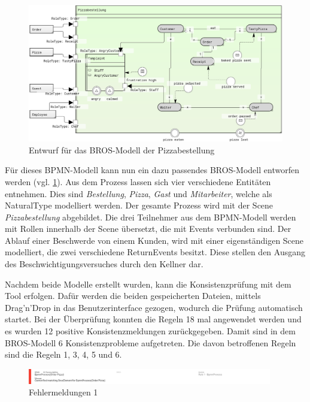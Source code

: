 \begin{figure}
    \centering
    \includegraphics[width=\textwidth,keepaspectratio]{../images/example/bros-rule1.png}%
    \caption{Entwurf für das BROS-Modell der Pizzabestellung}%
    \label{fig:pizzaBros1}
\end{figure}

Für dieses BPMN-Modell kann nun ein dazu passendes BROS-Modell entworfen werden (vgl. \cref{fig:pizzaBros1}).
Aus dem Prozess lassen sich vier verschiedene Entitäten entnehmen.
Dies sind \emph{Bestellung}, \emph{Pizza}, \emph{Gast} und \emph{Mitarbeiter}, welche als NaturalType modelliert werden.
Der gesamte Prozess wird mit der Scene \emph{Pizzabestellung} abgebildet.
Die drei Teilnehmer aus dem BPMN-Modell werden mit Rollen innerhalb der Scene übersetzt, die mit Events verbunden sind.
Der Ablauf einer Beschwerde von einem Kunden, wird mit einer eigenständigen Scene modelliert, die zwei verschiedene ReturnEvents besitzt.
Diese stellen den Ausgang des Beschwichtigungsversuches durch den Kellner dar.

Nachdem beide Modelle erstellt wurden, kann die Konsistenzprüfung mit dem Tool erfolgen.
Dafür werden die beiden gespeicherten Dateien, mittels Drag'n'Drop in das Benutzerinterface gezogen, wodurch die Prüfung automatisch startet.
Bei der Überprüfung konnten die Regeln 18 mal angewendet werden und es wurden 12 positive Konsistenzmeldungen zurückgegeben.
Damit sind in dem BROS-Modell 6 Konsistenzprobleme aufgetreten.
Die davon betroffenen Regeln sind die Regeln 1, 3, 4, 5 und 6.

\begin{figure}[H]
    \centering
     \includegraphics[width=0.95\textwidth,keepaspectratio]{../images/example/error1.png}%
    \caption{Fehlermeldungen 1}%
    \label{fig:error1}
\end{figure}

